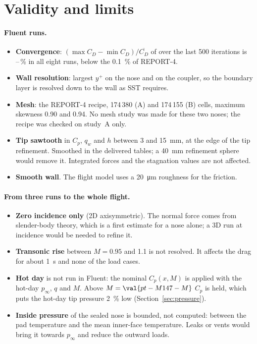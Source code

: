 \section{Validity and limits}
\label{sec:limits}

\paragraph{Fluent runs.}
\begin{itemize}
\item \textbf{Convergence}: $(\max C_D - \min C_D)/\overline{C_D}$ of  over the last 500
iterations is --\,\% in all eight runs, below the \SI{0.1}{\percent} of REPORT-4.
\item \textbf{Wall resolution}: largest $y^+$  on the nose and  on the
coupler, so the boundary layer is resolved down to the wall as SST requires.
\item \textbf{Mesh}: the REPORT-4 recipe, 174\,380 (A) and 174\,155 (B) cells, maximum skewness 0.90 and
0.94. No mesh study was made for these two noses; the recipe was checked on study~A only.
\item \textbf{Tip sawtooth} in $C_p$, $q_w$ and $h$ between 3 and \SI{15}{mm}, at the edge of the tip
refinement. Smoothed in the delivered tables; a \SI{40}{mm} refinement sphere would remove it. Integrated
forces and the stagnation values are not affected.
\item \textbf{Smooth wall}. The flight model uses a \SI{20}{\micro m} roughness for the friction.
\end{itemize}

\paragraph{From three runs to the whole flight.}
\begin{itemize}
\item \textbf{Zero incidence only} (2D axisymmetric). The normal force comes from slender-body theory,
which is a first estimate for a nose alone; a 3D run at incidence would be needed to refine it.
\item \textbf{Transonic rise} between $M = 0.95$ and 1.1 is not resolved. It affects the drag for about
\SI{1}{s} and none of the load cases.
\item \textbf{Hot day} is not run in Fluent: the nominal $C_p(x, M)$ is applied with the hot-day $p_\infty$,
$q$ and $M$. Above $M = \val{pt-M147-M}$ $C_p$ is held, which puts the hot-day tip pressure
\SI{2}{\percent} low (Section~\ref{sec:pressure}).
\item \textbf{Inside pressure} of the sealed nose is bounded, not computed: between the pad temperature
and the mean inner-face temperature. Leaks or vents would bring it towards $p_\infty$ and reduce
the outward loads.
\end{itemize}

